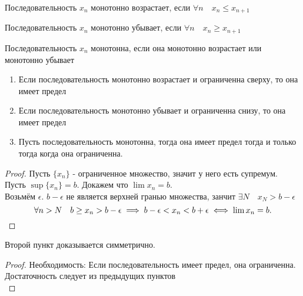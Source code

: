 \documentclass[11pt, oneside]{article}   	%
\begin{document}
\begin{definition}
    Последовательность $x_n$ монотонно возрастает, если $\forall{n}\quad x_n \le x_{n+1}$
\end{definition}
\begin{definition}
    Последовательность $x_n$ монотонно убывает, если $\forall{n}\quad x_n \ge x_{n+1}$
\end{definition}
\begin{definition}
    Последовательность $x_n$ монотонна, если она монотонно возрастает или монотонно убывает
\end{definition}
\begin{theorem}
    \begin{enumerate}
        \item Если последовательность монотонно возрастает и ограниченна сверху, то она имеет предел
        \item Если последовательность монотонно убывает и ограниченна снизу, то она имеет предел
        \item Пусть последовательность монотонна, тогда она имеет предел тогда и только тогда когда она ограниченна.
    \end{enumerate}
    \begin{proof}
        Пусть $\{x_n\} $ - ограниченное множество, значит у него есть супремум. Пусть  $\sup \{x_n\} = b$. Докажем что $\lim x_n = b$.\\
        Возьмём  $\epsilon$. $b-\epsilon$ не является верхней гранью множества, занчит $\exists{N}\quad x_N>b-\epsilon$
        \[ \forall{n>N}\quad b\ge x_n>b-\epsilon \implies b-\epsilon < x_n < b+\epsilon \iff \lim x_n = b .\qedhere\] 
    \end{proof}
    Второй пункт доказывается симметрично.
    \begin{proof}
        Необходимость: Если последовательность имеет предел, она ограниченна.\\
        Достаточность следует из предыдущих пунктов\\
    \end{proof}
\end{theorem}
\end{document}
